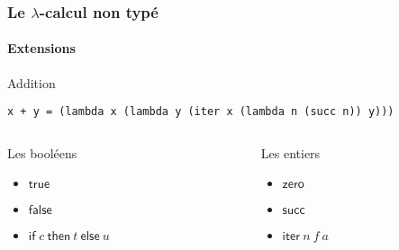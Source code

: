\documentclass{beamer}
\newcommand{\ifte}[4][]{\ensuremath{\mathsf{if}_{#1}\: #2\: \mathsf{then}\: #3\: \mathsf{else}\: #4}}
\newcommand{\true}{\ensuremath{\mathsf{true}}}
\newcommand{\false}{\ensuremath{\mathsf{false}}}
\newcommand{\zero}{\ensuremath{\mathsf{zero}}}
\newcommand{\succs}{\ensuremath{\mathsf{succ}}}
\newcommand{\iter}{\ensuremath{\mathsf{iter}}}
\begin{document}
\begin{frame}[b,fragile]
\frametitle{Le $\lambda$-calcul non typé}
\framesubtitle{Extensions}

\begin{block}{Addition}
\begin{center}
\begin{minipage}{.9\linewidth}
\begin{lstlisting}
x + y = (lambda x (lambda y (iter x (lambda n (succ n)) y)))
\end{lstlisting}
\end{minipage}
\end{center}
\end{block}

\vfill

\begin{columns}
  \begin{column}{.45\linewidth}
    \begin{block}{Les booléens}
      \begin{itemize}
      \item $\true$ 
      \item $\false$
      \item $\ifte{c}{t}{u}$
      \end{itemize}
    \end{block}
  \end{column}
  \begin{column}{.45\linewidth}
    \begin{block}{Les entiers}
      \begin{itemize}
      \item $\zero$ 
      \item $\succs$ 
      \item $\iter\:n\:f\:a$ 
      \end{itemize}
    \end{block}
  \end{column}
\end{columns}

\end{frame}
\end{document}
